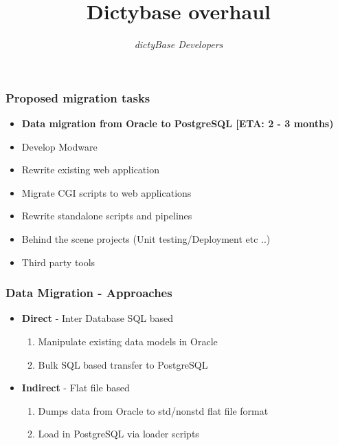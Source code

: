 \documentclass[hyperref={pdfpagelabels=false}, compress]{beamer}
\title{Dictybase overhaul}
\author{\textit{dictyBase Developers}}
\date
\begin{document}
\frame{\titlepage}



\section{}
\begin{frame}
	\frametitle{Proposed migration tasks}
	
    	\begin{itemize}
		\item \textbf{ Data migration from Oracle to PostgreSQL [ETA: 2 - 3 months)}
    		\item Develop Modware
    		\item Rewrite existing web application
    		\item Migrate CGI scripts to web applications 
    		\item Rewrite standalone scripts and pipelines
    		\item Behind the scene projects (Unit testing/Deployment etc ..)
    		\item Third party tools

	\end{itemize}
		
\end{frame}

\begin{frame}
    \frametitle{Data Migration - Approaches}
       \begin{itemize}
           \item \textbf{\huge Direct} - {\Large Inter Database SQL based}
           \begin{enumerate}
              \item Manipulate existing data models in Oracle
              \item Bulk SQL based transfer to PostgreSQL
           \end{enumerate}
           \item \textbf{\huge Indirect} - {\Large Flat file based}
            \begin{enumerate}
               \item Dumps data from Oracle to std/nonstd flat file format
               \item Load in PostgreSQL via loader scripts
            \end{enumerate}
       \end{itemize}
\end{frame}
\end{document}
